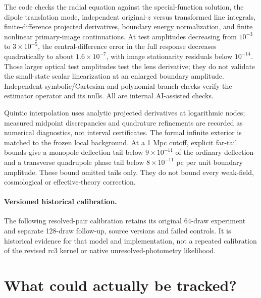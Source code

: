 \documentclass[11pt,a4paper]{article}
\begin{document}
The code checks the radial equation against the special-function
solution, the dipole translation mode, independent original-$z$ versus
transformed line integrals, finite-difference projected derivatives,
boundary energy normalization, and finite nonlinear primary-image
continuations. At test amplitudes decreasing from $10^{-3}$ to
$3\times10^{-5}$, the central-difference error in the full response
decreases quadratically to about $1.6\times10^{-7}$, with image
stationarity residuals below $10^{-14}$. Those larger optical test
amplitudes test the lens derivative; they do not validate the small-state
scalar linearization at an enlarged boundary amplitude. Independent
symbolic/Cartesian and polynomial-branch checks verify the estimator
operator and its nulls. All are internal AI-assisted checks.

Quintic interpolation uses analytic projected derivatives at logarithmic
nodes; measured midpoint discrepancies and quadrature refinements are
recorded as numerical diagnostics, not interval certificates. The formal
infinite exterior is matched to the frozen local background. At a
1 Mpc cutoff, explicit far-tail bounds give a monopole deflection tail
below $9\times10^{-11}$ of the ordinary deflection and a transverse
quadrupole phase tail below $8\times10^{-11}$ pc per unit boundary
amplitude. These bound omitted tails only. They do not bound every
weak-field, cosmological or effective-theory correction.


\paragraph{Versioned historical calibration.}
The following resolved-pair calibration retains its original 64-draw
experiment and separate 128-draw follow-up, source versions and failed
controls. It is historical evidence for that model and implementation,
not a repeated calibration of the revised rc3 kernel or native
unresolved-photometry likelihood.




\section{What could actually be tracked?}
\end{document}
